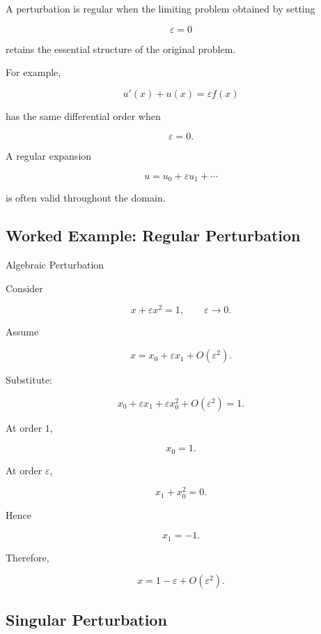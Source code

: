 A perturbation is regular when the limiting problem obtained by setting

\[
\varepsilon=0
\]

retains the essential structure of the original problem.

For example,

\[
u'(x)+u(x)=\varepsilon f(x)
\]

has the same differential order when

\[
\varepsilon=0.
\]

A regular expansion

\[
u=u_0+\varepsilon u_1+\cdots
\]

is often valid throughout the domain.

\subsection{Worked Example: Regular Perturbation}
\label{subsec:worked-regular-perturbation}

\begin{workedexamplebox}{Algebraic Perturbation}

Consider

\[
x+\varepsilon x^2=1,
\qquad
\varepsilon\to0.
\]

Assume

\[
x
=
x_0+\varepsilon x_1+O(\varepsilon^2).
\]

Substitute:

\[
x_0+\varepsilon x_1
+
\varepsilon x_0^2
+
O(\varepsilon^2)
=
1.
\]

At order \(1\),

\[
x_0=1.
\]

At order \(\varepsilon\),

\[
x_1+x_0^2=0.
\]

Hence

\[
x_1=-1.
\]

Therefore,

\begin{answerbox}
\[
\boxed{
x
=
1-\varepsilon
+
O(\varepsilon^2).
}
\]
\end{answerbox}

\end{workedexamplebox}

\subsection{Singular Perturbation}
\label{subsec:singular-perturbation}

